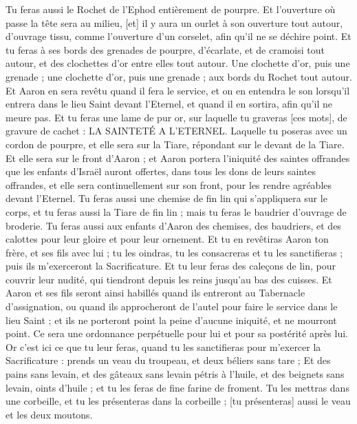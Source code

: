 \begin{multicols}{2}
Tu feras aussi le Rochet de l'Ephod entièrement de pourpre.
Et l'ouverture où passe la tête sera au milieu, [et] il y aura un ourlet à son ouverture tout autour, d'ouvrage tissu, comme l'ouverture d'un corselet, afin qu'il ne se déchire point.
Et tu feras à ses bords des grenades de pourpre, d'écarlate, et de cramoisi tout autour, et des clochettes d'or entre elles tout autour.
Une clochette d'or, puis une grenade ; une clochette d'or, puis une grenade ; aux bords du Rochet tout autour.
Et Aaron en sera revêtu quand il fera le service, et on en entendra le son lorsqu'il entrera dans le lieu Saint devant l'Eternel, et quand il en sortira, afin qu'il ne meure pas.
Et tu feras une lame de pur or, sur laquelle tu graveras [ces mots], de gravure de cachet : LA SAINTETÉ A L'ETERNEL.
Laquelle tu poseras avec un cordon de pourpre, et elle sera sur la Tiare, répondant sur le devant de la Tiare.
Et elle sera sur le front d'Aaron ; et Aaron portera l'iniquité des saintes offrandes que les enfants d'Israël auront offertes, dans tous les dons de leurs saintes offrandes, et elle sera continuellement sur son front, pour les rendre agréables devant l'Eternel.
Tu feras aussi une chemise de fin lin qui s'appliquera sur le corps, et tu feras aussi la Tiare de fin lin ; mais tu feras le baudrier d'ouvrage de broderie.
Tu feras aussi aux enfants d'Aaron des chemises, des baudriers, et des calottes pour leur gloire et pour leur ornement.
Et tu en revêtiras Aaron ton frère, et ses fils avec lui ; tu les oindras, tu les consacreras et tu les sanctifieras ; puis ils m'exerceront la Sacrificature.
Et tu leur feras des caleçons de lin, pour couvrir leur nudité, qui tiendront depuis les reins jusqu'au bas des cuisses.
Et Aaron et ses fils seront ainsi habillés quand ils entreront au Tabernacle d'assignation, ou quand ils approcheront de l'autel pour faire le service dans le lieu Saint ; et ils ne porteront point la peine d'aucune iniquité, et ne mourront point. Ce sera une ordonnance perpétuelle pour lui et pour sa postérité après lui.
\VerseOne{}Or c'est ici ce que tu leur feras, quand tu les sanctifieras pour m'exercer la Sacrificature : prends un veau du troupeau, et deux béliers sans tare ;
Et des pains sans levain, et des gâteaux sans levain pétris à l'huile, et des beignets sans levain, oints d'huile ; et tu les feras de fine farine de froment.
Tu les mettras dans une corbeille, et tu les présenteras dans la corbeille ; [tu présenteras] aussi le veau et les deux moutons.

\end{multicols}
